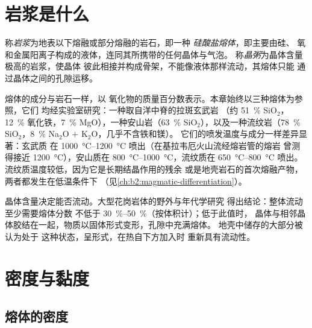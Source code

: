 \section{岩浆是什么}

\begin{definition}[岩浆]\label{def:b2:magma-emplacement:magma}
称\emph{岩浆}为地表以下熔融或部分熔融的岩石，即一种
\emph{硅酸盐熔体}，即主要由硅、
氧和金属阳离子构成的液体，连同其所携带的任何晶体与气泡。
称\emph{晶粥}为晶体含量极高的岩浆，使晶体
彼此相接并构成骨架，不能像液体那样流动，其熔体只能
通过晶体之间的孔隙运移。
\end{definition}

熔体的成分与岩石一样，以
氧化物的质量百分数表示。本章始终以三种熔体为参照，它们
均经实验室研究：一种取自洋中脊的拉斑玄武岩
（约 \qty{51}{\percent} SiO$_2$，\qty{12}{\percent} 氧化铁，\qty{7}{\percent}
MgO），一种安山岩（\qty{63}{\percent} SiO$_2$），以及一种流纹岩（\qty{78}{\percent}
SiO$_2$，\qty{8}{\percent} Na$_2$O $+$ K$_2$O，几乎不含铁和镁）。
它们的喷发温度与成分一样差异显著：玄武质
在 \qtyrange{1000}{1200}{\celsius} 喷出（在基拉韦厄火山流经熔岩管的熔岩
曾测得接近 \qty{1200}{\celsius}），安山质在
\qtyrange{800}{1000}{\celsius}，流纹质在 \qtyrange{650}{800}{\celsius} 喷出。
流纹质温度较低，因为它是长期结晶作用的残余
或是地壳岩石的首次熔融产物，两者都发生在低温条件下
（见\cref{ch:b2:magmatic-differentiation}）。

晶体含量决定能否流动。大型花岗岩体的野外与年代学研究
得出结论：整体流动至少需要熔体分数
不低于 \qtyrange{30}{50}{\percent}（按体积计）；低于此值时，
晶体与相邻晶体胶结在一起，物质以固体形式变形，孔隙中充满熔体。
地壳中储存的大部分被认为处于
这种状态，呈形式，在热自下方加入时
重新具有流动性。

\section{密度与黏度}

\subsection{熔体的密度}

